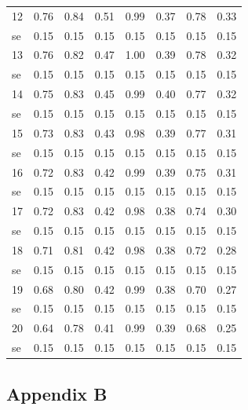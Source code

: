 \documentclass[11pt,preprint, authoryear]{elsarticle}
\numberwithin{equation}{section}
\numberwithin{figure}{section}
\numberwithin{table}{section}
\begin{document}
\begin{longtable}{lrrrrrrr}
  12 & 0.76 & 0.84 & 0.51 & 0.99 & 0.37 & 0.78 & 0.33 \\ 
  se & 0.15 & 0.15 & 0.15 & 0.15 & 0.15 & 0.15 & 0.15 \\ 
  13 & 0.76 & 0.82 & 0.47 & 1.00 & 0.39 & 0.78 & 0.32 \\ 
  se & 0.15 & 0.15 & 0.15 & 0.15 & 0.15 & 0.15 & 0.15 \\ 
  14 & 0.75 & 0.83 & 0.45 & 0.99 & 0.40 & 0.77 & 0.32 \\ 
  se & 0.15 & 0.15 & 0.15 & 0.15 & 0.15 & 0.15 & 0.15 \\ 
  15 & 0.73 & 0.83 & 0.43 & 0.98 & 0.39 & 0.77 & 0.31 \\ 
  se & 0.15 & 0.15 & 0.15 & 0.15 & 0.15 & 0.15 & 0.15 \\ 
  16 & 0.72 & 0.83 & 0.42 & 0.99 & 0.39 & 0.75 & 0.31 \\ 
  se & 0.15 & 0.15 & 0.15 & 0.15 & 0.15 & 0.15 & 0.15 \\ 
  17 & 0.72 & 0.83 & 0.42 & 0.98 & 0.38 & 0.74 & 0.30 \\ 
  se & 0.15 & 0.15 & 0.15 & 0.15 & 0.15 & 0.15 & 0.15 \\ 
  18 & 0.71 & 0.81 & 0.42 & 0.98 & 0.38 & 0.72 & 0.28 \\ 
  se & 0.15 & 0.15 & 0.15 & 0.15 & 0.15 & 0.15 & 0.15 \\ 
  19 & 0.68 & 0.80 & 0.42 & 0.99 & 0.38 & 0.70 & 0.27 \\ 
  se & 0.15 & 0.15 & 0.15 & 0.15 & 0.15 & 0.15 & 0.15 \\ 
  20 & 0.64 & 0.78 & 0.41 & 0.99 & 0.39 & 0.68 & 0.25 \\ 
  se & 0.15 & 0.15 & 0.15 & 0.15 & 0.15 & 0.15 & 0.15 \\ 
   \bottomrule
\end{longtable}
\endgroup

\hypertarget{appendix-b}{%
\subsection*{Appendix B}\label{appendix-b}}


\end{document}
